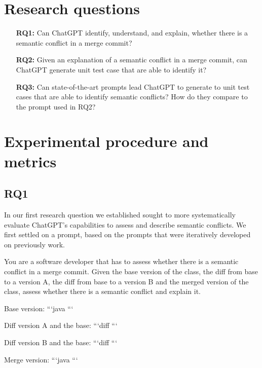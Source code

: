 \section{Research questions}

\begin{itemize}
  \item[\textbf{RQ1:}] Can ChatGPT identify, understand, and explain, whether
  there is a semantic conflict in a merge commit?

  \item[\textbf{RQ2:}] Given an explanation of a semantic conflict in a merge
  commit, can ChatGPT generate unit test case that are able to identify it?

  \item[\textbf{RQ3:}] Can state-of-the-art prompts lead ChatGPT to generate to
  unit test cases that are able to identify semantic conflicts?  How do they
  compare to the prompt used in RQ2?
\end{itemize}

\section{Experimental procedure and metrics}

\subsection{RQ1}

In our first research question we established sought to more systematically evaluate ChatGPT's capabilities to assess and describe semantic conflicts.
We first settled on a prompt, based on the prompts that were iteratively developed on previously work.

\begin{prompt}
You are a software developer that has to assess whether there is a semantic conflict in a merge commit.  Given the base version of the class, the diff from base to a version A, the diff from base to a version B and the merged version of the class, assess whether there is a semantic conflict and explain it.

Base version:
```java
```

Diff version A and the base:
```diff
```

Diff version B and the base:
```diff
```

Merge version:
```java
```
\end{prompt}

